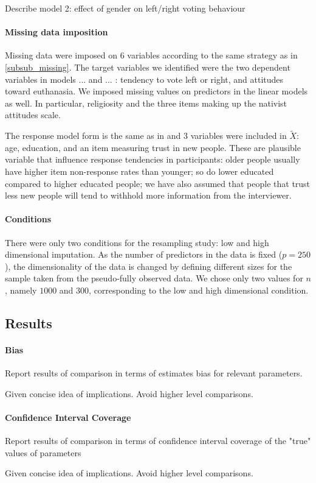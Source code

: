 	Describe model 2: effect of gender on left/right voting behaviour

\paragraph{Missing data imposition}

	Missing data were imposed on 6 variables according to the same strategy as in \ref{subsub_missing}.
	The target variables we identified were the two dependent variables in models ... and ... : 
	tendency to vote left or right, and attitudes toward euthanasia.
	We imposed missing values on predictors in the linear models as well. In particular, religiosity and the
	three items making up the nativist attitudes scale.

	The response model form is the same as in \label{eqn:rm} and 3 variables were included in $\tilde{X}$: 
	age, education, and an item measuring trust in new people. These are plausible variable that influence
	response tendencies in participants: older people usually have higher item non-response rates than younger;
	so do lower educated compared to higher educated people; we have also assumed that people that trust less
	new people will tend to withhold more information from the interviewer.

\paragraph{Conditions}
	There were only two conditions for the resampling study: low and high dimensional imputation.
	As the number of predictors in the data is fixed ($p = 250$), the dimensionality of the data is
	changed by defining different sizes for the sample taken from the pseudo-fully observed data.
	We chose only two values for $n$, namely $1000$ and $300$, corresponding to the low and high 
	dimensional condition.

\subsection{Results}
\paragraph{Bias}
	Report results of comparison in terms of estimates bias for relevant parameters.

	Given concise idea of implications. Avoid higher level comparisons.

\paragraph{Confidence Interval Coverage}
	Report results of comparison in terms of confidence interval coverage of the "true" values of parameters 

	Given concise idea of implications. Avoid higher level comparisons.
